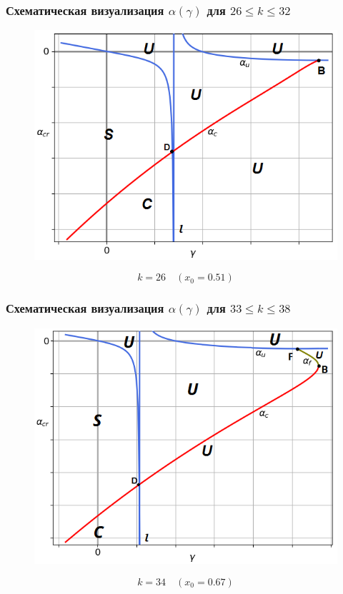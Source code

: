 \documentclass[fullscreen=true, unicode, bookmarks=false]{beamer}
\begin{document}
\begin{frame}
\frametitle{ Схематическая визуализация $ \alpha(\gamma) $ для $ 26 \leqslant k \leqslant 32 $ }

\begin{figure}[h]
\includegraphics[scale=0.55]{k=26.png} 
\end{figure}

$$ k=26 \quad (x_0=0.51) $$

\end{frame}

\begin{frame}
\frametitle{ Схематическая визуализация $ \alpha(\gamma) $ для $ 33 \leqslant k \leqslant 38 $ }

\begin{figure}[h]
\includegraphics[scale=0.55]{k=34.png} 
\end{figure}

$$ k=34 \quad (x_0=0.67) $$

\end{frame}
\end{document}
